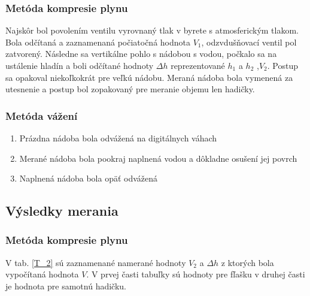 \documentclass[10pt]{scrartcl}
\begin{document}
\subsubsection{Metóda kompresie plynu}
Najskôr bol povolením ventilu vyrovnaný tlak v byrete s atmosferickým tlakom. Bola odčítaná a zaznamenaná počiatočná hodnota $V_1$, odzvdušňovací ventil pol zatvorený.
Následne sa vertikálne pohlo s nádobou s vodou, počkalo sa na ustálenie hladín a boli odčítané hodnoty $\Delta h$ reprezentované $h_1$ a $h_2$ ,$V_2$.
Postup sa opakoval niekoľkokrát pre veľkú nádobu. Meraná nádoba bola vymenená za utesnenie a postup bol zopakovaný pre meranie objemu len hadičky.


\subsubsection{Metóda vážení}
\begin{enumerate}
\item Prázdna nádoba bola odvážená na digitálnych váhach 
\item Merané nádoba bola pookraj naplnená vodou a dôkladne osušení jej povrch
\item Naplnená nádoba bola opäť odvážená
\end{enumerate}


\subsection{Výsledky merania}
\subsubsection{Metóda kompresie plynu}
V tab. \ref{T_2} sú zaznamenané namerané hodnoty $V_2$ a $\Delta h$
z ktorých bola vypočítaná hodnota $V$. 
V prvej časti tabuľky sú hodnoty pre fľašku v druhej časti je hodnota pre samotnú hadičku.
\end{document}
